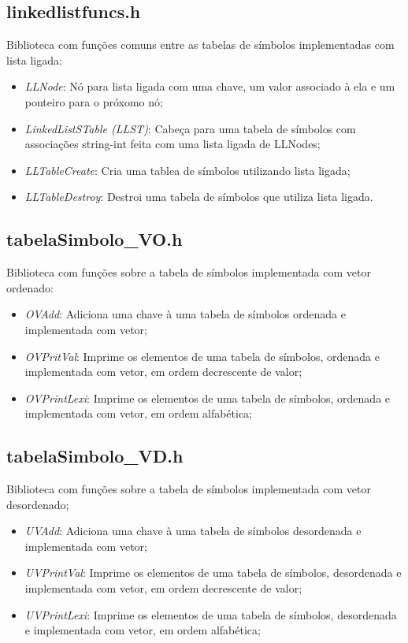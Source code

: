 \documentclass[12pt, a4paper]{article} %
\begin{document}
	\subsection{linkedlistfuncs.h}
	Biblioteca com funções comuns entre as tabelas de símbolos implementadas com lista ligada:
	\begin{itemize}
		\item \textit{LLNode}: Nó para lista ligada com uma chave, um valor associado à ela e um ponteiro para o próxomo nó;
		\item \textit{LinkedListSTable (LLST)}: Cabeça para uma tabela de símbolos com associações string-int feita com uma lista ligada de LLNodes;
		\item \textit{LLTableCreate}: Cria uma tablea de símbolos utilizando lista ligada;
		\item \textit{LLTableDestroy}: Destroi uma tabela de símbolos que utiliza lista ligada.
	\end{itemize}

	\subsection{tabelaSimbolo\_VO.h}
	Biblioteca com funções sobre a tabela de símbolos implementada com vetor ordenado:
	\begin{itemize}
		\item \textit{OVAdd}: Adiciona uma chave à uma tabela de símbolos ordenada e implementada com vetor;
		\item \textit{OVPritVal}: Imprime os elementos de uma tabela de símbolos, ordenada e implementada com vetor, em ordem decrescente de valor;
		\item \textit{OVPrintLexi}: Imprime os elementos de uma tabela de símbolos, ordenada e implementada com vetor, em ordem alfabética; 
	\end{itemize}

	\subsection{tabelaSimbolo\_VD.h}
	Biblioteca com funções sobre a tabela de símbolos implementada com vetor desordenado;
	\begin{itemize}
		\item \textit{UVAdd}: Adiciona uma chave à uma tabela de símbolos desordenada e implementada com vetor;
		\item \textit{UVPrintVal}: Imprime os elementos de uma tabela de símbolos, desordenada e implementada com vetor, em ordem decrescente de valor;
		\item \textit{UVPrintLexi}: Imprime os elementos de uma tabela de símbolos, desordenada e implementada com vetor, em ordem alfabética; 
	\end{itemize}
\end{document}

